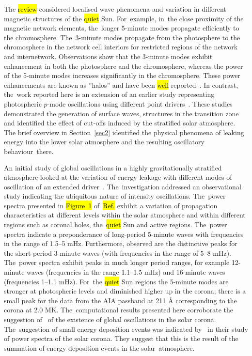 \documentclass[physics,article,accept,pdftex,moreauthors]{Definitions/mdpi}
\begin{document}
The  \hl{review} %
\cite{Khomenko2013} considered localised wave phenomena and variation in different magnetic structures of the 
 \hl{quiet}  
Sun. For~example, in~the close proximity of the magnetic network elements, the~longer 5-minute modes propagate efficiently to the chromosphere. The~3-minute modes propagate from the photosphere to the chromosphere in the network cell interiors for restricted regions of the network and internetwork.  Observations show that the 3-minute modes exhibit enhancement in both the photosphere and the chromosphere, whereas the power of the 5-minute modes increases significantly in the chromosphere. These power enhancements are known as 
''halos'' and have been %
 \hl{well}  
reported~\cite{Kontogiannis2010}. 
In contrast, the~work reported here is an extension of an earlier study representing photospheric $p$-mode oscillations using different point drivers~\cite{Malins2007}. These studies demonstrated  the generation of surface waves, structures in the transition zone and identified the effect of cut-offs induced by the stratified  solar atmosphere. The brief overview in Section~\ref{sec2} identified the physical phenomena of leaking energy into the lower solar atmosphere and the resulting oscillatory behaviour~there.

An initial study of global oscillations in a highly gravitationally stratified atmosphere looked at the variation of energy leakage with different modes of oscillation of an extended driver~\cite{Griffiths2018b}. The~investigation addressed an observational study indicating the ubiquitous nature of intensity oscillations. The~power spectra presented in 
\hl{Figure~1} %
of~\hl{Ref.} 
\cite{Griffiths2018b} exhibit a variation of propagation characteristics at different levels within the solar atmosphere and within different regions such as coronal holes, 
the~\hl{quiet} 
Sun and active regions. The~power spectra indicate a preponderance of long-period 5-minute waves with frequencies in the range of 1.5--5 mHz. Furthermore, observed are the distinctive peaks for the short-period 3-minute waves (with frequencies in the range of 5--8 mHz). The~power spectra exhibit  peaks in much longer period ranges, for example 12-minute waves  (frequencies in the range 1.1--1.5 mHz)  and 16-minute waves (frequencies 1--1.1 mHz). For~the 
\hl{quiet} 
Sun regions the 5-minute modes are stronger at photospheric levels and diminished higher up in the corona; there is a small peak for the data from the AIA passband at 211 {\AA} corresponding to the corona at 2.0 MK.  The~computational results presented here corroborate the suggestion of~\cite{Didkovsky2013} of the existence of global oscillations in the solar corona. The~suggestion of small energy deposition events was indicated by~\cite{Ireland2015} in their study of power spectra of the solar corona. They suggest that this is the result of the summation of energy deposition events in the solar~atmosphere.
\end{document}
